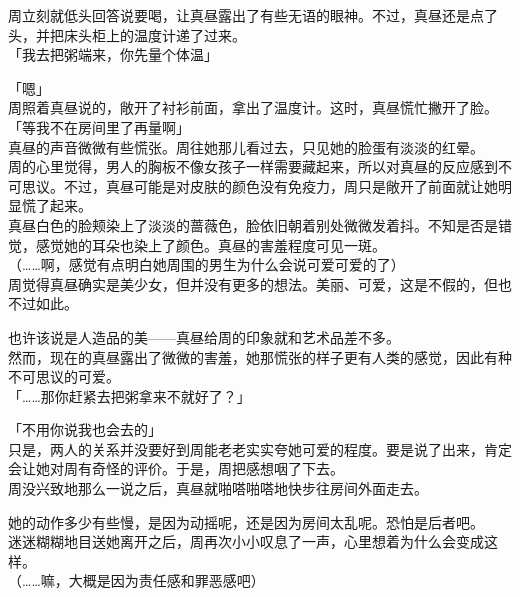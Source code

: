 周立刻就低头回答说要喝，让真昼露出了有些无语的眼神。不过，真昼还是点了头，并把床头柜上的温度计递了过来。\\

「我去把粥端来，你先量个体温」

「嗯」\\

周照着真昼说的，敞开了衬衫前面，拿出了温度计。这时，真昼慌忙撇开了脸。\\

「等我不在房间里了再量啊」\\

真昼的声音微微有些慌张。周往她那儿看过去，只见她的脸蛋有淡淡的红晕。\\

周的心里觉得，男人的胸板不像女孩子一样需要藏起来，所以对真昼的反应感到不可思议。不过，真昼可能是对皮肤的颜色没有免疫力，周只是敞开了前面就让她明显慌了起来。\\

真昼白色的脸颊染上了淡淡的蔷薇色，脸依旧朝着别处微微发着抖。不知是否是错觉，感觉她的耳朵也染上了颜色。真昼的害羞程度可见一斑。\\

（……啊，感觉有点明白她周围的男生为什么会说可爱可爱的了）\\

周觉得真昼确实是美少女，但并没有更多的想法。美丽、可爱，这是不假的，但也不过如此。

也许该说是人造品的美——真昼给周的印象就和艺术品差不多。\\

然而，现在的真昼露出了微微的害羞，她那慌张的样子更有人类的感觉，因此有种不可思议的可爱。\\

「……那你赶紧去把粥拿来不就好了？」

「不用你说我也会去的」\\

只是，两人的关系并没要好到周能老老实实夸她可爱的程度。要是说了出来，肯定会让她对周有奇怪的评价。于是，周把感想咽了下去。\\

周没兴致地那么一说之后，真昼就啪嗒啪嗒地快步往房间外面走去。

她的动作多少有些慢，是因为动摇呢，还是因为房间太乱呢。恐怕是后者吧。\\

迷迷糊糊地目送她离开之后，周再次小小叹息了一声，心里想着为什么会变成这样。\\

（……嘛，大概是因为责任感和罪恶感吧）\\

